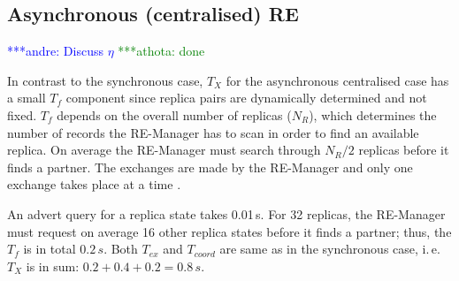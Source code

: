 \documentclass{rspublic}
\newcommand{\alnote}[1]{ {\textcolor{blue} { ***andre: #1 }}}
\newcommand{\athotanote}[1]{ {\textcolor{green} { ***athota: #1 }}}
\newcommand{\alnote}[1]{}
\newcommand{\athotanote}[1]{}
\begin{document}

\subsection{Asynchronous (centralised) RE}
\alnote{Discuss $\eta$} \athotanote{done}

In contrast to the synchronous case, $T_X$ for the asynchronous
centralised case has a small $T_f$ component since replica pairs are
dynamically determined and not fixed. $T_f$ depends on the overall
number of replicas ($N_R$), which determines the number of records the
RE-Manager has to scan in order to find an available replica. On
average the RE-Manager must search through $N_R/2$ replicas before it
finds a partner.  The exchanges are made by the RE-Manager and only
one exchange takes place at a time .




An advert query for a replica state takes 0.01\,s. For 32 replicas,
the RE-Manager must request on average 16 other replica states before
it finds a partner; thus, the $T_f$ is in total $0.2\,s$. Both
$T_{ex}$ and $T_{coord}$ are same as in the synchronous case, i.\,e.\
$T_{X}$ is in sum: $0.2+0.4+0.2=0.8\,s$.
\end{document}
